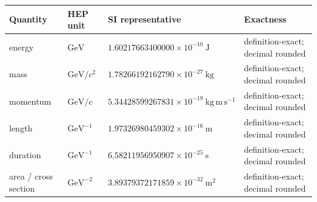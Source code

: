 \begin{tabularx}{\linewidth}{@{}L{31mm}L{29mm}L{43mm}Y@{}}
\toprule
Quantity & HEP unit & SI representative & Exactness \\
\midrule
energy & \(\mathrm{GeV}\) & \(1.60217663400000\times 10^{-10}\ \mathrm{J}\) & definition-exact; decimal rounded \\
mass & \(\mathrm{GeV}/c^2\) & \(1.78266192162790\times 10^{-27}\ \mathrm{kg}\) & definition-exact; decimal rounded \\
momentum & \(\mathrm{GeV}/c\) & \(5.34428599267831\times 10^{-19}\ \mathrm{kg\,m\,s^{-1}}\) & definition-exact; decimal rounded \\
length & \(\mathrm{GeV}^{-1}\) & \(1.97326980459302\times 10^{-16}\ \mathrm{m}\) & definition-exact; decimal rounded \\
duration & \(\mathrm{GeV}^{-1}\) & \(6.58211956950907\times 10^{-25}\ \mathrm{s}\) & definition-exact; decimal rounded \\
area / cross section & \(\mathrm{GeV}^{-2}\) & \(3.89379372171859\times 10^{-32}\ \mathrm{m^2}\) & definition-exact; decimal rounded \\
\bottomrule
\end{tabularx}
